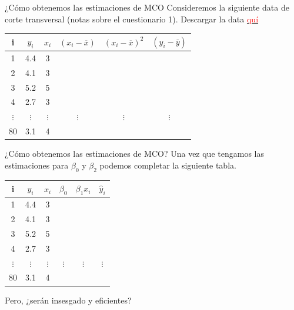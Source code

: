 \begin{frame}{¿Cómo obtenemos las estimaciones de MCO}
	Consideremos la siguiente data de corte transversal (notas sobre el cuestionario 1). Descargar la data \href{https://econweb.rutgers.edu/frojas/teaching/undergraduate/grades_data.xlsx}{\textcolor{red}{quí}}
	
	\begin{table}
		\centering
		\begin{tabular}{cccccc}
			i & $y_i$ & $x_i$ & $(x_i - \overline{x})$ & $(x_i - \overline{x})^2$ & $(y_i - \overline{y})$ \\
			\hline
			1 & 4.4 & 3 & {} & {} & {}\\
			2 & 4.1 & 3 & {} & {} & {}\\
			3 & 5.2 & 5 & {} & {} & {}\\
			4 & 2.7 & 3 & {} & {} & {}\\
			$\vdots$ & $\vdots$ & $\vdots$ & $\vdots$ & $\vdots$ & $\vdots$ \\
			80 & 3.1 & 4 & {} & {} & {} \\
			\hline
		\end{tabular}
	\end{table}
\end{frame}
\begin{frame}{¿Cómo obtenemos las estimaciones de MCO?}
	Una vez que tengamos las estimaciones para $\beta_0$ y $\beta_2$ podemos completar la siguiente tabla.
	\begin{table}
		\centering
		\begin{tabular}{cccccc}
			i & $y_i$ & $x_i$ & $\beta_0$ & $\beta_1x_i$ & $\widehat{y}_i$ \\
			\hline
			1 & 4.4 & 3 & {} & {} & {}\\
			2 & 4.1 & 3 & {} & {} & {}\\
			3 & 5.2 & 5 & {} & {} & {}\\
			4 & 2.7 & 3 & {} & {} & {}\\
			$\vdots$ & $\vdots$ & $\vdots$ & $\vdots$ & $\vdots$ & $\vdots$ \\
			80 & 3.1 & 4 & {} & {} & {} \\
			\hline
		\end{tabular}
	\end{table}
	Pero, ¿serán insesgado y eficientes?
\end{frame}

